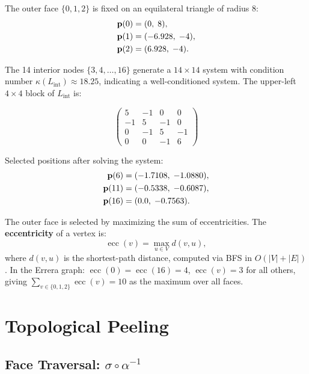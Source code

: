\documentclass[12pt,letterpaper]{article}
\theoremstyle{plain}
\theoremstyle{definition}
\theoremstyle{remark}
\newcommand{\ecc}{\operatorname{ecc}}
\begin{document}
The outer face $\{0, 1, 2\}$ is fixed on an equilateral triangle of radius 8:
\begin{align}
    \mathbf{p}(0) &= (0,\; 8), \notag \\
    \mathbf{p}(1) &= (-6.928,\; -4), \notag \\
    \mathbf{p}(2) &= (6.928,\; -4). \notag
\end{align}

The 14 interior nodes $\{3, 4, \ldots, 16\}$ generate a $14 \times 14$ system
with condition number $\kappa(L_{\text{int}}) \approx 18.25$, indicating a
well-conditioned system. The upper-left $4 \times 4$ block of $L_{\text{int}}$
is:

\begin{equation}
\begin{pmatrix}
 5 & -1 &  0 &  0 \\
-1 &  5 & -1 &  0 \\
 0 & -1 &  5 & -1 \\
 0 &  0 & -1 &  6
\end{pmatrix}
\end{equation}

Selected positions after solving the system:
\begin{align}
    \mathbf{p}(6)  &= (-1.7108,\; -1.0880), \notag \\
    \mathbf{p}(11) &= (-0.5338,\; -0.6087), \notag \\
    \mathbf{p}(16) &= (0.0,\; -0.7563). \notag
\end{align}

The outer face is selected by maximizing the sum of eccentricities. The
\textbf{eccentricity} of a vertex is:
\begin{equation}
    \ecc(v) = \max_{u \in V} d(v, u),
\end{equation}
where $d(v, u)$ is the shortest-path distance, computed via BFS in
$O(|V| + |E|)$. In the Errera graph: $\ecc(0) = \ecc(16) = 4$,
$\ecc(v) = 3$ for all others, giving
$\sum_{v \in \{0,1,2\}} \ecc(v) = 10$ as the maximum over all faces.

\section{Topological Peeling}
\label{sec:peeling}

\subsection{Face Traversal: \texorpdfstring{$\sigma \circ \alpha^{-1}$}{sigma composed with alpha inverse}}
\end{document}

